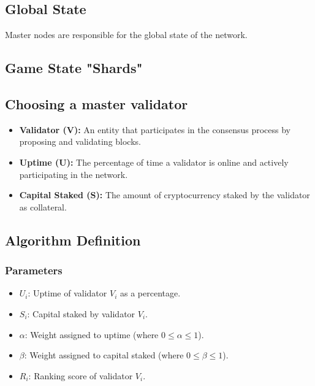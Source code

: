 \documentclass{article}
\begin{document}
\subsection{Global State}

Master nodes are responsible for the global state of the network.

\subsection{Game State "Shards"}

\subsection{Choosing a master validator}

\begin{itemize}
    \item \textbf{Validator (V):} An entity that participates in the consensus process by proposing and validating blocks.
    \item \textbf{Uptime (U):} The percentage of time a validator is online and actively participating in the network.
    \item \textbf{Capital Staked (S):} The amount of cryptocurrency staked by the validator as collateral.
\end{itemize}

\subsection{Algorithm Definition}

\subsubsection{Parameters}

\begin{itemize}
    \item \( U_i \): Uptime of validator \( V_i \) as a percentage.
    \item \( S_i \): Capital staked by validator \( V_i \).
    \item \( \alpha \): Weight assigned to uptime (where \( 0 \leq \alpha \leq 1 \)).
    \item \( \beta \): Weight assigned to capital staked (where \( 0 \leq \beta \leq 1 \)).
    \item \( R_i \): Ranking score of validator \( V_i \).
\end{itemize}
\end{document}
